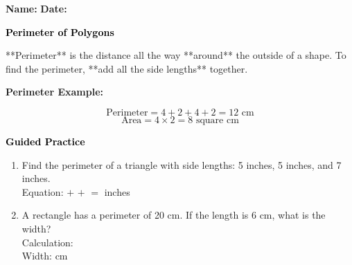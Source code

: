 \documentclass[12pt, letterpaper, fleqn]{article}
\newcommand{\blank}{\underline{\hspace{2.2cm}}}
\begin{document}
\textbf{Name:} \underline{\hspace{5cm}}
\hfill
\textbf{Date:} \underline{\hspace{3cm}}\\

\begin{tcolorbox}[colback=customteal!20]
    \large\textcolor{black}{\textbf{Perimeter of Polygons}}
\end{tcolorbox}

\vspace{3mm}
\noindent
**Perimeter** is the distance all the way **around** the outside of a shape.
To find the perimeter, **add all the side lengths** together.

\begin{tcolorbox}[colback=white, colframe=black!25, boxrule=0.6pt, arc=4mm]
\textbf{Perimeter Example:}
\begin{center}
\end{center}
\[
\text{Perimeter} = 4 + 2 + 4 + 2 = 12\text{ cm}
\]
\[
\text{Area} = 4 \times 2 = 8\text{ square cm}
\]
\end{tcolorbox}

\newpage
\begin{tcolorbox}[colback=customteal!20]
    \large\textcolor{black}{\textbf{Guided Practice}}
\end{tcolorbox}

\vspace{5mm}
\begin{enumerate}[itemsep=3cm, leftmargin=0.6cm]
\item Find the perimeter of a triangle with side lengths: 5 inches, 5 inches, and 7 inches.
\\
Equation: \blank $+$ \blank $+$ \blank $=$ \blank inches

\item A rectangle has a perimeter of 20 cm. If the length is 6 cm, what is the width?
\\
Calculation: \vspace{2cm}
\\
Width: \blank cm
\end{enumerate}
\end{document}
